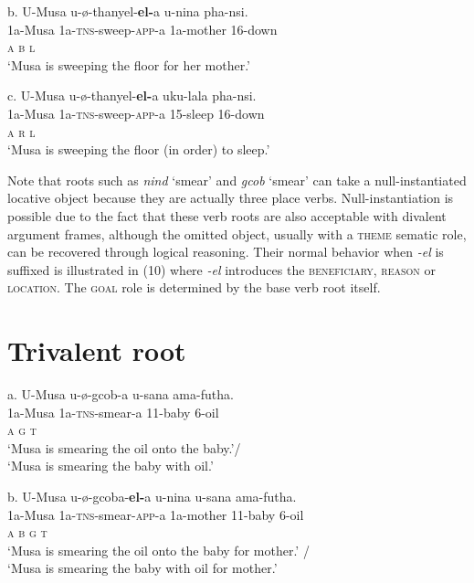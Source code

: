 \documentclass[output=paper]{langsci/langscibook}
\begin{document}
\gll   b.  U-Musa    u-ø-thanyel-\textbf{el-}a     u-nina           pha-nsi.\\
         1a-Musa     1a-\textsc{tns}{}-sweep-\textsc{app}{}-a  1a-mother     16-down\\
         \textsc{a                  b          l}\\
\glt     ‘Musa is sweeping the floor for her mother.’
\z

\gll   c.  U-Musa    u-ø-thanyel-\textbf{el-}a          uku-lala  pha-nsi.\\
         1a-Musa     1a-\textsc{tns}{}-sweep-\textsc{app}{}-a  15-sleep  16-down\\
         \textsc{a                  r        l}\\
\glt     ‘Musa is sweeping the floor (in order) to sleep.’
\z

Note that roots such as \textit{nind} ‘smear’ and \textit{gcob} ‘smear’ can take a null-instantiated locative object because they are actually three place verbs. Null-instantiation is possible due to the fact that these verb roots are also acceptable with divalent argument frames, although the omitted object, usually with a \textsc{theme }sematic role, can be recovered through logical reasoning. Their normal behavior when \textit{{}-el} is suffixed is illustrated in (10) where \textit{{}-el} introduces the \textsc{beneficiary}, \textsc{reason} or \textsc{location}. The \textsc{goal} role is determined by the base verb root itself.

\chapter{Trivalent root}
\gll   a.  U-Musa    u-ø-gcob-a           u-sana    ama-futha. \\
         1a-Musa     1a-\textsc{tns}{}-smear-a  11-baby   6-oil\\
         \textsc{a                  g      t}\\
\glt     ‘Musa is smearing the oil onto the baby.’/\\
    ‘Musa is smearing the baby with oil.’
\z

\gll   b.  U-Musa    u-ø-gcoba-\textbf{el-}a         u-nina    u-sana      ama-futha. \\
         1a-Musa     1a-\textsc{tns}{}-smear-\textsc{app}{}-a  1a-mother  11-baby   6-oil\\
         \textsc{a                  b        g      t}\\
\glt ‘Musa is smearing the oil onto the baby for mother.’ /\\
‘Musa is smearing the baby with oil for mother.’
\z
\end{document}
